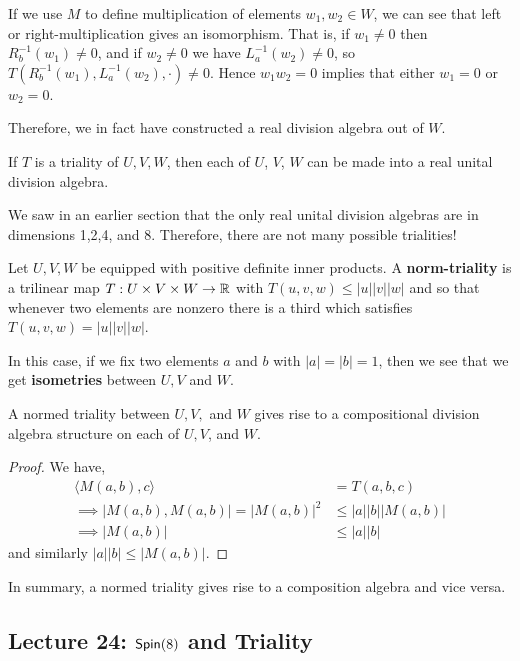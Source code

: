 \begin{remark*}
    If we use $M$ to define multiplication of elements $w_1,w_2\in W$, we can see that left or right-multiplication gives an isomorphism. That is, if $w_1\neq 0$ then $R_b^{-1}(w_1)\neq 0$, and if $w_2\neq 0$ we have $L_a^{-1}(w_2)\neq 0$, so $T(R_b^{-1}(w_1),L_a^{-1}(w_2),\cdot)\neq 0$. Hence $w_1w_2=0$ implies that either $w_1=0$ or $w_2=0$.

    Therefore, we in fact have constructed a real division algebra out of $W$.
\end{remark*}
\begin{cor}
    If $T$ is a triality of $U,V,W$, then each of $U$, $V$, $W$ can be made into a real unital division algebra.
\end{cor}
\begin{remark*}
    We saw in an earlier section that the only real unital division algebras are in dimensions 1,2,4, and 8. Therefore, there are not many possible trialities!
\end{remark*}
\begin{defn}
Let $U,V,W$ be equipped with positive definite inner products. A \textbf{norm-triality} is a trilinear map $T:U\times V\times W \to \operatorname{\mathbb{R}}$ with $T(u,v,w)\leq |u||v||w|$ and so that whenever two elements are nonzero there is a third which satisfies $T(u,v,w) = |u||v||w|$.
\end{defn}
\begin{remark*}
    In this case, if we fix two elements $a$ and $b$ with $|a|=|b|=1$, then we see that we get \textbf{isometries} between $U,V$ and $W$.
\end{remark*}
\begin{cor}
    A normed triality between $U,V,$ and $W$ gives rise to a compositional division algebra structure on each of $U,V$, and $W$.
\end{cor}
\begin{proof}
    We have,
    \begin{align*}
        \langle M(a,b),c\rangle &= T(a,b,c)\\
        \implies |M(a,b),M(a,b)| = |M(a,b)|^2 &\leq |a||b||M(a,b)|\\
        \implies |M(a,b)|&\leq |a||b|
    \end{align*}
    and similarly $|a||b| \leq |M(a,b)|$.
\end{proof}
In summary, a normed triality gives rise to a composition algebra and vice versa.

\subsection{Lecture 24: $\operatorname{\textsf{Spin}}(8)$ and Triality}
